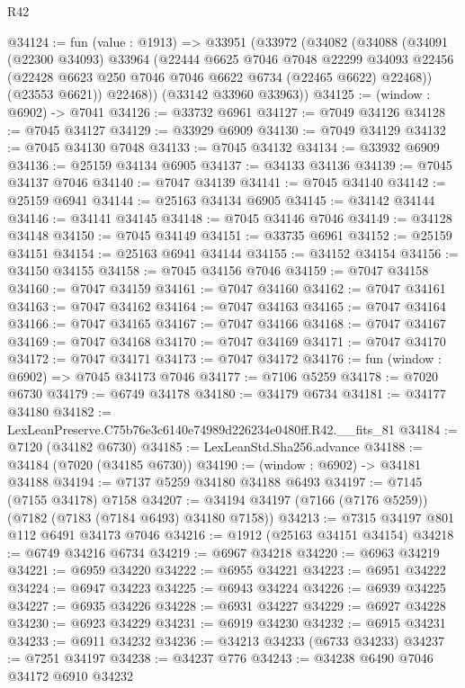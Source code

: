 \begin{lexlean}{R42}
\begin{coremodule}
{@34124 := fun (value : @1913) =>
  @33951
    (@33972
      (@34082
        (@34088
          (@34091
            (@22300 @34093)
            @33964
            (@22444
              @6625
              @7046
              @7048
              @22299
              @34093
              @22456
              (@22428 @6623 @250 @7046 @7046 @6622 @6734 (@22465 @6622) @22468))
            (@23553 @6621))
          @22468))
      (@33142 @33960 @33963))
@34125 := (window : @6902) -> @7041
@34126 := @33732 @6961
@34127 := @7049 @34126
@34128 := @7045 @34127
@34129 := @33929 @6909
@34130 := @7049 @34129
@34132 := @7045 @34130 @7048
@34133 := @7045 @34132
@34134 := @33932 @6909
@34136 := @25159 @34134 @6905
@34137 := @34133 @34136
@34139 := @7045 @34137 @7046
@34140 := @7047 @34139
@34141 := @7045 @34140
@34142 := @25159 @6941
@34144 := @25163 @34134 @6905
@34145 := @34142 @34144
@34146 := @34141 @34145
@34148 := @7045 @34146 @7046
@34149 := @34128 @34148
@34150 := @7045 @34149
@34151 := @33735 @6961
@34152 := @25159 @34151
@34154 := @25163 @6941 @34144
@34155 := @34152 @34154
@34156 := @34150 @34155
@34158 := @7045 @34156 @7046
@34159 := @7047 @34158
@34160 := @7047 @34159
@34161 := @7047 @34160
@34162 := @7047 @34161
@34163 := @7047 @34162
@34164 := @7047 @34163
@34165 := @7047 @34164
@34166 := @7047 @34165
@34167 := @7047 @34166
@34168 := @7047 @34167
@34169 := @7047 @34168
@34170 := @7047 @34169
@34171 := @7047 @34170
@34172 := @7047 @34171
@34173 := @7047 @34172
@34176 := fun (window : @6902) => @7045 @34173 @7046
@34177 := @7106 @5259
@34178 := @7020 @6730
@34179 := @6749 @34178
@34180 := @34179 @6734
@34181 := @34177 @34180
@34182 := LexLeanPreserve.C75b76e3c6140e74989d226234e0480ff.R42.__fits_81
@34184 := @7120 (@34182 @6730)
@34185 := LexLeanStd.Sha256.advance
@34188 := @34184 (@7020 (@34185 @6730))
@34190 := (window : @6902) -> @34181 @34188
@34194 := @7137 @5259 @34180 @34188 @6493
@34197 := @7145 (@7155 @34178) @7158
@34207 := @34194 @34197 (@7166 (@7176 @5259)) (@7182 (@7183 (@7184 @6493) @34180 @7158))
@34213 := @7315 @34197 @801 @112 @6491 @34173 @7046
@34216 := @1912 (@25163 @34151 @34154)
@34218 := @6749 @34216 @6734
@34219 := @6967 @34218
@34220 := @6963 @34219
@34221 := @6959 @34220
@34222 := @6955 @34221
@34223 := @6951 @34222
@34224 := @6947 @34223
@34225 := @6943 @34224
@34226 := @6939 @34225
@34227 := @6935 @34226
@34228 := @6931 @34227
@34229 := @6927 @34228
@34230 := @6923 @34229
@34231 := @6919 @34230
@34232 := @6915 @34231
@34233 := @6911 @34232
@34236 := @34213 @34233 (@6733 @34233)
@34237 := @7251 @34197
@34238 := @34237 @776
@34243 := @34238 @6490 @7046 @34172 @6910 @34232
}
\end{coremodule}
\end{lexlean}
